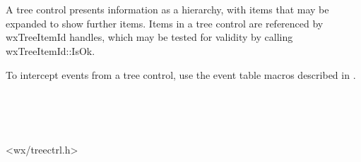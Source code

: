 \section{}\label{wxtreectrl}

A tree control presents information as a hierarchy, with items that may be expanded
to show further items. Items in a tree control are referenced by wxTreeItemId handles,
which may be tested for validity by calling wxTreeItemId::IsOk.

To intercept events from a tree control, use the event table macros described in .


\\
\\
\\


<wx/treectrl.h>


